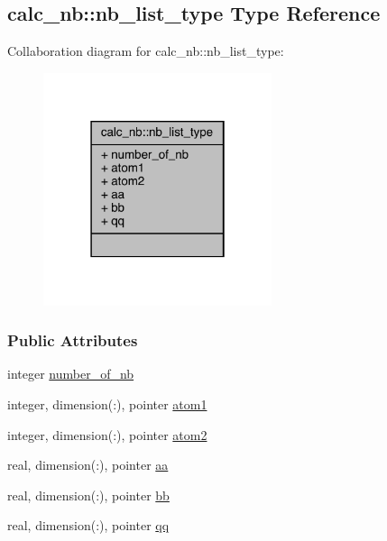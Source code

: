 \hypertarget{structcalc__nb_1_1nb__list__type}{\subsection{calc\-\_\-nb\-:\-:nb\-\_\-list\-\_\-type Type Reference}
\label{structcalc__nb_1_1nb__list__type}
}


Collaboration diagram for calc\-\_\-nb\-:\-:nb\-\_\-list\-\_\-type\-:
\nopagebreak
\begin{figure}[H]
\begin{center}
\leavevmode
\includegraphics[width=190pt]{structcalc__nb_1_1nb__list__type__coll__graph}
\end{center}
\end{figure}
\subsubsection*{Public Attributes}
\begin{DoxyCompactItemize}
\item 
integer \hyperlink{structcalc__nb_1_1nb__list__type_aeef1a1cda77d9cc96df57d5e328867c3}{number\-\_\-of\-\_\-nb}
\item 
integer, dimension(\-:), pointer \hyperlink{structcalc__nb_1_1nb__list__type_a2928459700a98302496379f1e8cf75b4}{atom1}
\item 
integer, dimension(\-:), pointer \hyperlink{structcalc__nb_1_1nb__list__type_a7ae08aa09ac66530236f4db05133cee2}{atom2}
\item 
real, dimension(\-:), pointer \hyperlink{structcalc__nb_1_1nb__list__type_a8f29d9b8ef04324f2d01fb2fd46676dd}{aa}
\item 
real, dimension(\-:), pointer \hyperlink{structcalc__nb_1_1nb__list__type_ade080755ef1cc55afb08c326d7d65f90}{bb}
\item 
real, dimension(\-:), pointer \hyperlink{structcalc__nb_1_1nb__list__type_a7c9db0402cc4acb30b45bf031b0b401e}{qq}
\end{DoxyCompactItemize}


